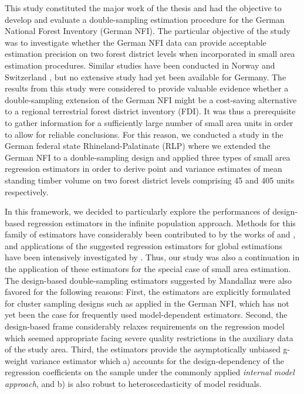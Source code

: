 This study constituted the major work of the thesis and had the objective to develop and evaluate a double-sampling estimation procedure for the German National Forest Inventory (German NFI). The particular objective of the study was to investigate whether the German NFI data can provide acceptable estimation precision on two forest district levels when incorporated in small area estimation procedures. Similar studies have been conducted in Norway \citep{breidenbach2012} and Switzerland \citep{magnussen2014a, steinmann2013}, but no extensive study had yet been available for Germany. The results from this study were considered to provide valuable evidence whether a double-sampling extension of the German NFI might be a cost-saving alternative to a regional terrestrial forest district inventory (FDI). It was thus a prerequisite to gather information for a sufficiently large number of small area units in order to allow for reliable conclusions. For this reason, we conducted a study in the German federal state Rhineland-Palatinate (RLP) where we extended the German NFI to a double-sampling design and applied three types of small area regression estimators in order to derive point and variance estimates of mean standing timber volume on two forest district levels comprising 45 and 405 units respectively.\par

In this framework, we decided to particularly explore the performances of design-based regression estimators in the infinite population approach. Methods for this family of estimators have considerably been contributed to by the works of \citet{mandallaz2008, mandallaz2013a, mandallaz2013c} and \citet{mandallaz2013b}, and applications of the suggested regression estimators for global estimations have been intensively investigated by \citet{massey2015_thesis}. Thus, our study was also a continuation in the application of these estimators for the special case of small area estimation. The design-based double-sampling estimators suggested by Mandallaz were also favored for the following reasons: First, the estimators are explicitly formulated for cluster sampling designs such as applied in the German NFI, which has not yet been the case for frequently used model-dependent estimators. Second, the design-based frame considerably relaxes requirements on the regression model which seemed appropriate facing severe quality restrictions in the auxiliary data of the study area. Third, the estimators provide the asymptotically unbiased g-weight variance estimator which a) accounts for the design-dependency of the regression coefficients on the sample under the commonly applied \textit{internal model approach}, and b) is also robust to heteroscedasticity of model residuals.\par

